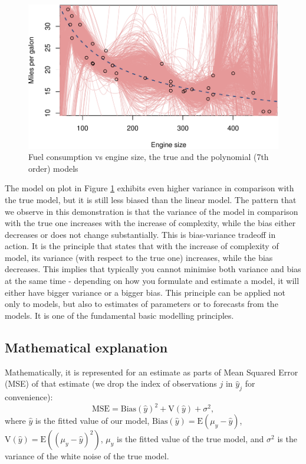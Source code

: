 \documentclass[
]{book}
\theoremstyle{definition}
\theoremstyle{definition}
\theoremstyle{definition}
\theoremstyle{definition}
\theoremstyle{remark}
\begin{document}
\begin{figure}
\centering
\includegraphics{Svetunkov---Statistics-for-Business-Analytics_files/figure-latex/biasVariance05-1.pdf}
\caption{\label{fig:biasVariance05}Fuel consumption vs engine size, the true and the polynomial (7th order) models}
\end{figure}

The model on plot in Figure \ref{fig:biasVariance05} exhibits even higher variance in comparison with the true model, but it is still less biased than the linear model. The pattern that we observe in this demonstration is that the variance of the model in comparison with the true one increases with the increase of complexity, while the bias either decreases or does not change substantially. This is bias-variance tradeoff in action. It is the principle that states that with the increase of complexity of model, its variance (with respect to the true one) increases, while the bias decreases. This implies that typically you cannot minimise both variance and bias at the same time - depending on how you formulate and estimate a model, it will either have bigger variance or a bigger bias. This principle can be applied not only to models, but also to estimates of parameters or to forecasts from the models. It is one of the fundamental basic modelling principles.

\hypertarget{mathematical-explanation}{%
\subsection{Mathematical explanation}\label{mathematical-explanation}}

Mathematically, it is represented for an estimate as parts of Mean Squared Error (MSE) of that estimate (we drop the index of observations \(j\) in \(\hat{y}_j\) for convenience):
\begin{equation}
    \mathrm{MSE} = \mathrm{Bias}(\hat{y})^2 + \mathrm{V}(\hat{y}) + \sigma^2 ,
    \label{eq:biasVariance01}
\end{equation}
where \(\hat{y}\) is the fitted value of our model, \(\mathrm{Bias}(\hat{y})=\mathrm{E}(\mu_y-\hat{y})\), \(\mathrm{V}(\hat{y})=\mathrm{E}\left((\mu_y-\hat{y})^2\right)\), \(\mu_y\) is the fitted value of the true model, and \(\sigma^2\) is the variance of the white noise of the true model.
\end{document}
